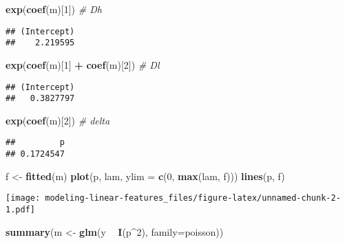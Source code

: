 \documentclass[]{article}
\newenvironment{Shaded}{\begin{snugshade}}{\end{snugshade}}
\newcommand{\KeywordTok}[1]{\textcolor[rgb]{0.13,0.29,0.53}{\textbf{#1}}}
\newcommand{\DataTypeTok}[1]{\textcolor[rgb]{0.13,0.29,0.53}{#1}}
\newcommand{\DecValTok}[1]{\textcolor[rgb]{0.00,0.00,0.81}{#1}}
\newcommand{\StringTok}[1]{\textcolor[rgb]{0.31,0.60,0.02}{#1}}
\newcommand{\CommentTok}[1]{\textcolor[rgb]{0.56,0.35,0.01}{\textit{#1}}}
\newcommand{\OperatorTok}[1]{\textcolor[rgb]{0.81,0.36,0.00}{\textbf{#1}}}
\newcommand{\NormalTok}[1]{#1}
\begin{document}
\begin{Shaded}
\begin{Highlighting}[]
\KeywordTok{exp}\NormalTok{(}\KeywordTok{coef}\NormalTok{(m)[}\DecValTok{1}\NormalTok{]) }\CommentTok{# Dh}
\end{Highlighting}
\end{Shaded}

\begin{verbatim}
## (Intercept) 
##    2.219595
\end{verbatim}

\begin{Shaded}
\begin{Highlighting}[]
\KeywordTok{exp}\NormalTok{(}\KeywordTok{coef}\NormalTok{(m)[}\DecValTok{1}\NormalTok{] }\OperatorTok{+}\StringTok{ }\KeywordTok{coef}\NormalTok{(m)[}\DecValTok{2}\NormalTok{]) }\CommentTok{# Dl}
\end{Highlighting}
\end{Shaded}

\begin{verbatim}
## (Intercept) 
##   0.3827797
\end{verbatim}

\begin{Shaded}
\begin{Highlighting}[]
\KeywordTok{exp}\NormalTok{(}\KeywordTok{coef}\NormalTok{(m)[}\DecValTok{2}\NormalTok{]) }\CommentTok{# delta}
\end{Highlighting}
\end{Shaded}

\begin{verbatim}
##         p 
## 0.1724547
\end{verbatim}

\begin{Shaded}
\begin{Highlighting}[]
\NormalTok{f <-}\StringTok{ }\KeywordTok{fitted}\NormalTok{(m)}
\KeywordTok{plot}\NormalTok{(p, lam, }\DataTypeTok{ylim =} \KeywordTok{c}\NormalTok{(}\DecValTok{0}\NormalTok{, }\KeywordTok{max}\NormalTok{(lam, f)))}
\KeywordTok{lines}\NormalTok{(p, f)}
\end{Highlighting}
\end{Shaded}

\texttt{[image: modeling-linear-features\_files/figure-latex/unnamed-chunk-2-1.pdf]}

\begin{Shaded}
\begin{Highlighting}[]
\KeywordTok{summary}\NormalTok{(m <-}\StringTok{ }\KeywordTok{glm}\NormalTok{(y }\OperatorTok{~}\StringTok{ }\KeywordTok{I}\NormalTok{(p}\OperatorTok{^}\DecValTok{2}\NormalTok{), }\DataTypeTok{family=}\NormalTok{poisson))}
\end{Highlighting}
\end{Shaded}
\end{document}
